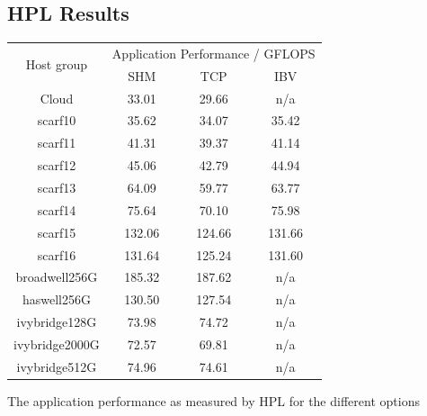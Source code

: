 \documentclass{article}
\begin{document}
    \subsection{HPL Results}
        \label{appendix:hpl-data}
        \begin{center}
            \centering
            \begin{tabular}{ |c||c|c|c|  }
             \hline
             \multirow{2}{*}{Host group} & \multicolumn{3}{c|}{Application Performance / GFLOPS} \\
             \cline{2-4}
                                      & SHM & TCP & IBV\\
             \hline
                  Cloud & 33.01 & 29.66 & n/a\\
                  scarf10 & 35.62 & 34.07 & 35.42\\
                  scarf11 & 41.31 & 39.37 & 41.14\\
                  scarf12 & 45.06 & 42.79 & 44.94\\
                  scarf13 & 64.09 & 59.77 & 63.77\\
                  scarf14 & 75.64 & 70.10 & 75.98\\
                  scarf15 & 132.06 & 124.66 & 131.66\\
                  scarf16 & 131.64 & 125.24 & 131.60\\
                  broadwell256G & 185.32 & 187.62 & n/a\\
                  haswell256G & 130.50 & 127.54 & n/a\\
                  ivybridge128G & 73.98 & 74.72 & n/a\\
                  ivybridge2000G & 72.57 & 69.81 & n/a\\
                  ivybridge512G & 74.96 & 74.61 & n/a\\
             \hline
            \end{tabular}
            \captionsetup{type=table}
            \caption{The application performance as measured by HPL for the different options}
        \end{center}
\end{document}
